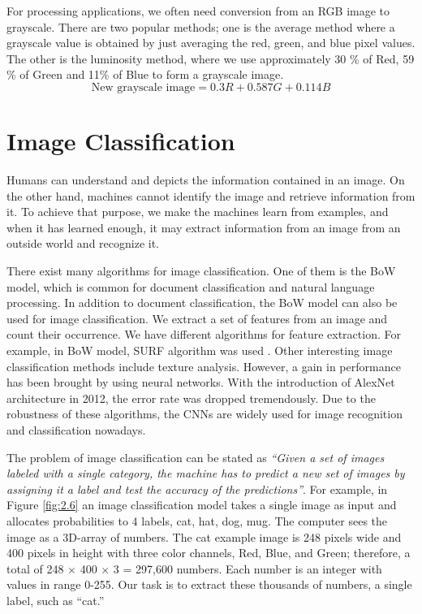 For processing applications, we often need conversion from an RGB image to grayscale. There are two popular methods; one is the average method where a grayscale value is obtained by just averaging the red, green, and blue pixel values. The other is the luminosity method, where we use approximately 30 \% of Red, 59 \% of Green and
11\% of Blue to form a grayscale image.
\begin{equation}
    \mbox{New grayscale image} = 0.3R + 0.587G + 0.114B
\end{equation}
\section{Image Classification}
Humans can understand and depicts the information contained in an image. On the other hand, machines cannot identify the image and retrieve information from it. To achieve that purpose, we make the machines learn from examples, and when it has learned enough, it may extract information from an image from an outside world and recognize it.

There exist many algorithms for image classification. One of them is the BoW model, which is common for document classification and natural language processing. In addition to document classification, the BoW model can also be used for image classification. We extract a set of features from an image and count their occurrence. We have different algorithms for feature extraction. For example, in 
BoW model, SURF algorithm was used \cite{chap_2_article:8}. Other interesting image classification methods include texture analysis. However, a gain in performance has been brought by using neural networks. With the introduction of AlexNet architecture in 
2012, the error rate was dropped tremendously. Due to the robustness of these algorithms, the CNNs are widely used for image recognition and classification nowadays. 

The problem of image classification can be stated as \textit{“Given a set of 
images labeled with a single category, the machine has to predict a new set 
of images by assigning it a label and test the accuracy of the predictions”}. For 
example, in Figure \ref{fig:2.6} an image classification model takes a single image
as input and allocates probabilities to 4 labels, {cat, hat, dog, mug}.
The computer sees the image as a 
3D-array of numbers. The cat example image is 248 pixels wide and 400 pixels in height with three color channels, Red, Blue, and Green; therefore, a total of 248 $\times$ 400 $\times$ 3  = 297,600 numbers. Each number is an integer with values in range 0-255. Our task is to extract these thousands of numbers, a single label, such as “cat.” 

